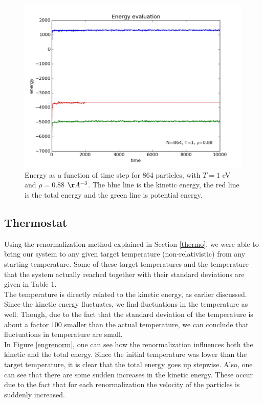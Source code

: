 \documentclass{article}
\begin{document}
\begin{multicols}{2}
\begin{figure}[H]
\begin{center}
\includegraphics[width=\linewidth]{plots/energyT1rho088N864lpnum1000.pdf}
\caption{Energy as a function of time step for 864 particles, with $T=1$ eV and $\rho = 0.88$ $\AA ^{-3}$.  The blue line is the kinetic energy, the red line is the total energy and the green line is potential energy.}
\label{engcons}
\end{center}
\end{figure}

\subsection{Thermostat}

Using the renormalization method explained in Section \ref{thermo}, we were able to bring our system to any given target temperature (non-relativistic) from any starting temperature.  Some of these target temperatures and the temperature that the system actually reached together with their standard deviations are given in Table 1. \\

The temperature is directly related to the kinetic energy, as earlier discussed. Since the kinetic energy fluctuates, we find fluctuations in the temperature as well. Though, due to the fact that the standard deviation of the temperature is about a factor $100$ smaller than the actual temperature, we can conclude that fluctuations in temperature are small. \\

In Figure \ref{engrenorm}, one can see how the renormalization influences both the kinetic and the total energy. Since the initial temperature was lower than the target temperature, it is clear that the total energy goes up stepwise. Also, one can see that there are some sudden increases in the kinetic energy. These occur due to the fact that for each renormalization the velocity of the particles is suddenly increased. 


\end{multicols}
\end{document}

